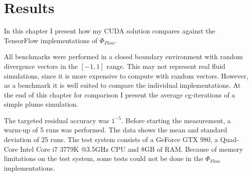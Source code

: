 \chapter{Results}\label{chapter:results}

In this chapter I present how my CUDA solution compares against the TensorFlow implementations of $\Phi_{Flow}$.
\par All benchmarks were performed in a closed boundary environment with random divergence vectors in the $\left[-1, 1 \right]$ range. This may not represent real fluid simulations, since it is more expensive to compute with random vectors. However, as a benchmark it is well suited to compare the individual implementations. At the end of this chapter for comparison I present the average cg-iterations of a simple plume simulation.
\par The targeted residual accuracy was $1^{-5}$. Before starting the measurement, a warm-up of 5 runs was performed. The data shows the mean and standard deviation of 25 runs. The test system consists of a GeForce GTX 980, a Quad-Core Intel Core i7 3779K @3.5GHz CPU and 8GB of RAM. Because of memory limitations on the test system, some tests could not be done in the $\Phi_{Flow}$ implementations.

